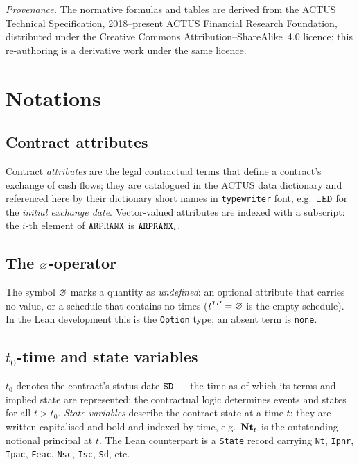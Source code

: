 \medskip
\noindent\emph{Provenance.}  The normative formulas and tables are derived from
the ACTUS Technical Specification, \textcopyright{} 2018--present ACTUS
Financial Research Foundation, distributed under the Creative Commons
Attribution--ShareAlike~4.0 licence; this re-authoring is a derivative work
under the same licence.

\section{Notations}\label{sec:notations}

\subsection{Contract attributes}
Contract \emph{attributes} are the legal contractual terms that define a
contract's exchange of cash flows; they are catalogued in the ACTUS data
dictionary and referenced here by their dictionary short names in
\texttt{typewriter} font, e.g.\ $\texttt{IED}$ for the \emph{initial exchange
date}.  Vector-valued attributes are indexed with a subscript: the $i$-th
element of $\texttt{ARPRANX}$ is $\texttt{ARPRANX}_i$.

\subsection{The \texorpdfstring{$\varnothing$}{null}-operator}
The symbol $\varnothing$ marks a quantity as \emph{undefined}: an optional attribute
that carries no value, or a schedule that contains no times
($\vec{t}^{IP}=\varnothing$ is the empty schedule).  In the Lean development this is the
\texttt{Option} type; an absent term is \texttt{none}.

\subsection{\texorpdfstring{$t_0$}{t0}-time and state variables}
$t_0$ denotes the contract's status date $\texttt{SD}$ --- the time as of which
its terms and implied state are represented; the contractual logic determines
events and states for all $t>t_0$.  \emph{State variables} describe the contract
state at a time $t$; they are written capitalised and bold and indexed by time,
e.g.\ $\mathbf{Nt}_{t}$ is the outstanding notional principal at $t$.  The Lean
counterpart is a \texttt{State} record carrying \texttt{Nt}, \texttt{Ipnr},
\texttt{Ipac}, \texttt{Feac}, \texttt{Nsc}, \texttt{Isc}, \texttt{Sd}, etc.

